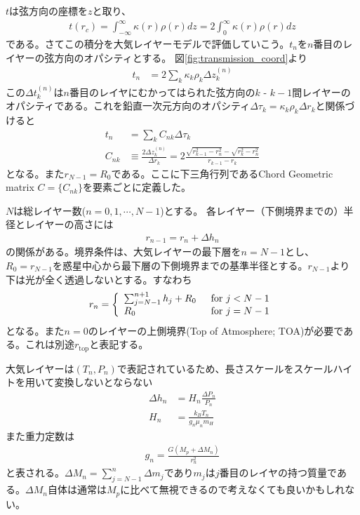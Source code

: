 $t$は弦方向の座標を$z$と取り、
\begin{align}
    t(r_c) = \int_{-\infty}^\infty \kappa(r) \rho(r) dz = 2 \int_{0}^\infty \kappa(r) \rho(r) dz
\end{align}
である。さてこの積分を大気レイヤーモデルで評価していこう。$t_n$を$n$番目のレイヤーの弦方向のオパシティとする。
図\ref{fig:transmission_coord}より
\begin{align}
    t_n &= 2 \sum_k \kappa_k \rho_k \Delta z^{(n)}_k 
\end{align}
この$\Delta t^{(n)}_k$は$n$番目のレイヤにむかってはられた弦方向の$k$ - $k-1$間レイヤーのオパシティである。これを鉛直一次元方向のオパシティ$\Delta \tau_k = \kappa_k \rho_k \Delta r_k$と関係づけると
\begin{align}
    t_n &= \sum_k  C_{nk} \Delta \tau_k \\
    \label{eq:chord_geo_matrix}
    C_{nk} &\equiv \frac{2 \Delta z^{(n)}_k}{\Delta r_k}
    = 2 \frac{\sqrt{r_{k-1}^2 - r_{n}^2} - \sqrt{r_{k}^2 - r_{n}^2}}{r_{k-1} - r_{k}}
\end{align}
となる。また$r_{N-1}=R_0$である。ここに下三角行列であるChord Geometric matrix $C = \{ C_{nk} \}$を要素ごとに定義した。

$N$は総レイヤー数($n=0,1,\cdots,N-1$)とする。
各レイヤー（下側境界までの）半径とレイヤーの高さには
\begin{align}
r_{n-1} = r_n + \Delta h_n
\end{align}
の関係がある。境界条件は、大気レイヤーの最下層を$n=N-1$とし、$R_0 = r_{N-1}$を惑星中心から最下層の下側境界までの基準半径とする。$r_{N-1}$より下は光が全く透過しないとする。すなわち
\begin{align}
    r_{n} =
\left\{
\begin{array}{ll}
\sum_{j=N-1}^{n+1} h_j + R_0 & \mbox{\, for $j<N-1$} \\
R_0 & \mbox{\, for $j=N-1$} 
\end{array}
\right.
\end{align}
となる。また$n=0$のレイヤーの上側境界(Top of Atmosphere; TOA)が必要である。これは別途$r_\mathrm{top}$と表記する。

大気レイヤーは$(T_n,P_n)$で表記されているため、長さスケールをスケールハイトを用いて変換しないとならない
\begin{align}
\Delta h_n &=  H_n \frac{\Delta P_n}{P_n} \\
\label{eq:H_each}
 H_n &= \frac{k_B T_n}{g_n \mu_n m_H} 
\end{align}
また重力定数は
\begin{align}
g_n = \frac{G (M_p + \Delta M_n)}{r_n^2}
\end{align}
と表される。$\Delta M_n = \sum_{j=N-1}^n \Delta m_j$であり$m_j$は$j$番目のレイヤの持つ質量である。$\Delta M_n$自体は通常は$M_p$に比べて無視できるので考えなくても良いかもしれない。

